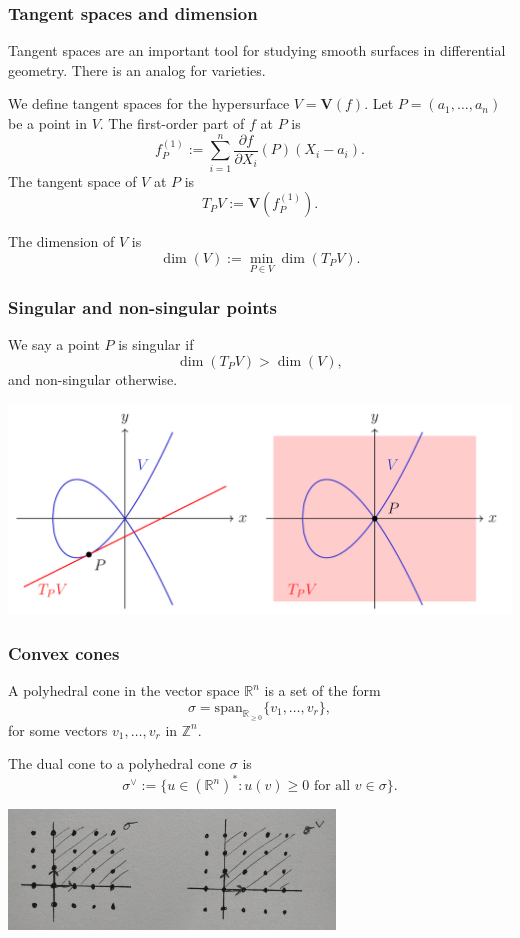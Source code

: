 \documentclass{beamer}
\theoremstyle{definition}
\theoremstyle{definition}
\begin{document}
\begin{frame}
\frametitle{Tangent spaces and dimension}
Tangent spaces are an important tool for studying smooth surfaces in differential geometry.
There is an analog for varieties.

We define tangent spaces for the hypersurface $V = \mathbf{V}(f)$.
Let $P = (a_1, \ldots, a_n)$ be a point in $V$.
The first-order part of $f$ at $P$ is
$$f_P^{(1)} := \sum_{i=1}^n \frac{\partial f}{\partial X_i}(P) (X_i-a_i).$$
The \alert{tangent space} of $V$ at $P$ is
$$T_P V:= \mathbf{V}(f_P^{(1)}).$$

The \alert{dimension} of $V$ is 
$$\dim(V) := \min_{P \in V} \dim(T_PV).$$
\end{frame}

\begin{frame}
\frametitle{Singular and non-singular points}
We say a point $P$ is \alert{singular} if 
$$\dim(T_PV) > \dim(V),$$
and non-singular otherwise.

\includegraphics[width=\textwidth]{tangent_spaces}

\end{frame}

\begin{frame}
\frametitle{Convex cones}
A \alert{polyhedral cone} in the vector space $\mathbb{R}^n$ is a set of the form
$$\sigma = \mathrm{span}_{\mathbb{R}_{\ge 0}}\{v_1, \ldots, v_r\},$$
for some vectors $v_1, \ldots, v_r$ in $\mathbb{Z}^n$.

The \alert{dual cone} to a polyhedral cone $\sigma$ is
$$\sigma^\vee := \{u \in (\mathbb{R}^n)^* : u(v) \ge 0 \text{ for all } v \in \sigma\}.$$

\centerline{\includegraphics[width=0.65\textwidth]{basic_cone_and_dual}}
\end{frame}
\end{document}
